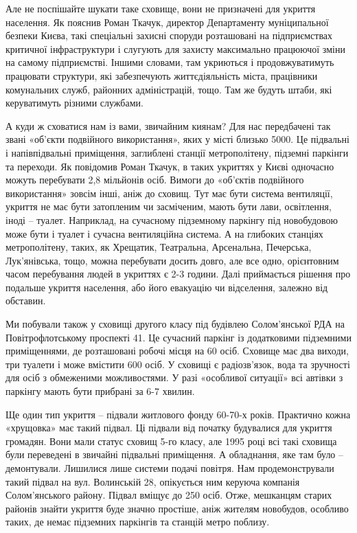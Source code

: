 
Але не поспішайте шукати таке сховище, вони не призначені для укриття
населення. Як пояснив Роман Ткачук, директор Департаменту муніципальної безпеки
Києва, такі спеціальні захисні споруди розташовані на підприємствах критичної
інфраструктури і слугують для захисту максимально працюючої зміни на самому
підприємстві. Іншими словами, там укриються і продовжуватимуть працювати
структури, які забезпечують життєдіяльність міста, працівники комунальних
служб, районних адміністрацій, тощо. Там же будуть штаби, які керуватимуть
різними службами.

А куди ж сховатися нам із вами, звичайним киянам? Для нас передбачені так звані
«об’єкти подвійного використання», яких у місті близько 5000. Це підвальні і
напівпідвальні приміщення, заглиблені станції метрополітену, підземні паркінги
та переходи. Як повідомив Роман Ткачук, в таких укриттях у Києві одночасно
можуть перебувати 2,8 мільйонів осіб. Вимоги до «об’єктів подвійного
використання» зовсім інші, аніж до сховищ. Тут має бути система вентиляції,
укриття не має бути затопленим чи засміченим, мають бути лави, освітлення,
іноді – туалет. Наприклад, на сучасному підземному паркінгу під новобудовою
може бути і туалет і сучасна вентиляційна система. А на глибоких станціях
метрополітену, таких, як Хрещатик, Театральна, Арсенальна, Печерська,
Лук’янівська, тощо, можна перебувати досить довго, але все одно, орієнтовним
часом перебування людей в укриттях є 2-3 години.  Далі приймається рішення про
подальше укриття населення, або його евакуацію чи відселення, залежно від
обставин.


Ми побували також у сховищі другого класу під будівлею Солом’янської РДА на
Повітрофлотському проспекті 41. Це сучасний паркінг із додатковими підземними
приміщеннями, де розташовані робочі місця на 60 осіб. Сховище має два виходи,
три туалети і може вмістити 600 осіб. У сховищі є радіозв’язок, вода та
зручності для осіб з обмеженими можливостями.  У разі «особливої ситуації» всі
автівки з паркінгу мають бути прибрані за 6-7 хвилин.


Ще один тип укриття – підвали житлового фонду 60-70-х років. Практично кожна
«хрущовка» має такий підвал. Ці підвали від початку будувалися для укриття
громадян. Вони мали статус сховищ 5-го класу, але 1995 році всі такі сховища
були переведені в звичайні підвальні приміщення. А обладнання, яке там було –
демонтували. Лишилися лише системи подачі повітря. Нам продемонстрували такий
підвал на вул. Волинській 28, опікується ним керуюча компанія Солом’янського
району.  Підвал вміщує до 250 осіб. Отже, мешканцям старих районів знайти
укриття буде значно простіше, аніж жителям новобудов, особливо таких, де немає
підземних паркінгів та станцій метро поблизу.

